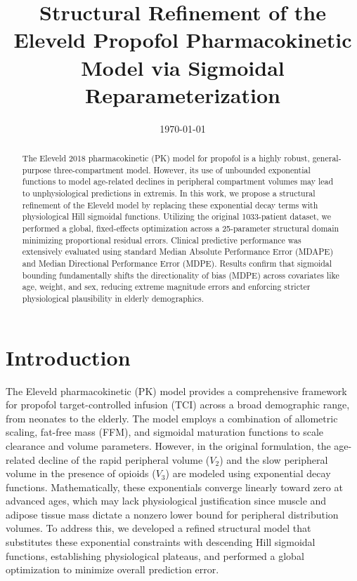 \documentclass[12pt,a4paper]{article}
\title{Structural Refinement of the Eleveld Propofol Pharmacokinetic Model via Sigmoidal Reparameterization}
\author{}
\date{\today}
\begin{document}
\maketitle

\begin{abstract}
The Eleveld 2018 pharmacokinetic (PK) model for propofol is a highly robust, general-purpose three-compartment model. However, its use of unbounded exponential functions to model age-related declines in peripheral compartment volumes may lead to unphysiological predictions in extremis. In this work, we propose a structural refinement of the Eleveld model by replacing these exponential decay terms with physiological Hill sigmoidal functions. Utilizing the original 1033-patient dataset, we performed a global, fixed-effects optimization across a 25-parameter structural domain minimizing proportional residual errors. Clinical predictive performance was extensively evaluated using standard Median Absolute Performance Error (MDAPE) and Median Directional Performance Error (MDPE). Results confirm that sigmoidal bounding fundamentally shifts the directionality of bias (MDPE) across covariates like age, weight, and sex, reducing extreme magnitude errors and enforcing stricter physiological plausibility in elderly demographics.
\end{abstract}

\section{Introduction}
The Eleveld pharmacokinetic (PK) model provides a comprehensive framework for propofol target-controlled infusion (TCI) across a broad demographic range, from neonates to the elderly. The model employs a combination of allometric scaling, fat-free mass (FFM), and sigmoidal maturation functions to scale clearance and volume parameters. However, in the original formulation, the age-related decline of the rapid peripheral volume ($V_2$) and the slow peripheral volume in the presence of opioids ($V_3$) are modeled using exponential decay functions. Mathematically, these exponentials converge linearly toward zero at advanced ages, which may lack physiological justification since muscle and adipose tissue mass dictate a nonzero lower bound for peripheral distribution volumes. To address this, we developed a refined structural model that substitutes these exponential constraints with descending Hill sigmoidal functions, establishing physiological plateaus, and performed a global optimization to minimize overall prediction error.
\end{document}
